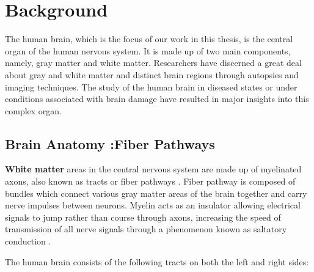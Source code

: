 \documentclass[../structure.tex]{subfiles}
\begin{document}
\chapter{Background}
The human brain, which is the focus of our work in this thesis, is the central organ of the human nervous system. It is made up of two main components, namely, gray 	     			    matter and white matter. Researchers have discerned a great deal about gray and white matter and distinct brain regions through autopsies and imaging techniques. The study 		of the human brain in diseased states or under conditions associated with brain damage have resulted in major insights into this complex organ.

\section{Brain Anatomy :Fiber Pathways}

	 \textbf{White matter} areas in the central nervous system are made up of myelinated axons, also known as tracts or fiber pathways \cite{Blumenfeld2010}. Fiber pathway is composed of bundles which connect various gray matter areas of the brain together and carry nerve impulses between neurons. Myelin acts as an insulator allowing electrical signals to jump rather than course through axons, increasing the speed of transmission of all nerve signals through a phenomenon known as saltatory conduction \cite{Klein2008}.
	
	The human brain consists of the following tracts on both the left and right sides:
	\begin{comment}
   \begin{itemize}
       \item Anterior Thalamic Radiation (ATR)
       \item Corpus Callosum (CC)
       \item Genu of the Corpus Callosum (genu)
       \item Splenium of the Corpus Callosum (splenium)
       \item Body of Corpus Callosum (truncus)
		\item Cingulum (Cing)
		\item Corticospinal Tract (CST)
		\item Inferior Fronto-occipital Fasciculus (IFO)
		\item Inferior Longitudinal Fasciculus (ILF)
		\item Superior Longitudinal Fasciculus (SLF)
		\item Ventral Tegmental Area (VTA)
	\end{itemize}
	\end{comment}
\end{document}

